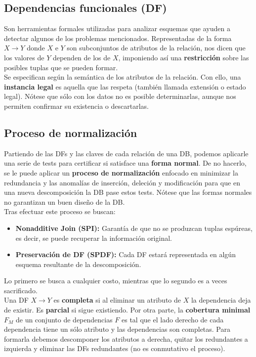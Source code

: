 \subsection*{Dependencias funcionales (DF)}
Son herramientas formales utilizadas para analizar esquemas que ayuden a detectar algunos de los problemas mencionados. Representadas de la forma $X \rightarrow Y$ donde $X$ e $Y$ son subconjuntos de atributos de la relación, nos dicen que los valores de $Y$ dependen de los de $X$, imponiendo así una \textbf{restricción} sobre las posibles tuplas que se pueden formar. \\
Se especifican según la semántica de los atributos de la relación. Con ello, una \textbf{instancia legal} es aquella que las respeta (también llamada extensión o estado legal). Nótese que sólo con los datos no es posible determinarlas, aunque nos permiten confirmar su existencia o descartarlas.

\subsection*{Proceso de normalización}
Partiendo de las DFs y las claves de cada relación de una DB, podemos aplicarle una serie de tests para certificar si satisface una \textbf{forma normal}. De no hacerlo, se le puede aplicar un \textbf{proceso de normalización} enfocado en minimizar la redundancia y las anomalías de inserción, deleción y modificación para que en una nueva descomposición la DB pase estos tests. Nótese que las formas normales no garantizan un buen diseño de la DB. \\
Tras efectuar este proceso se buscan:
\begin{itemize}
    \item \textbf{Nonadditive Join (SPI):} Garantía de que no se produzcan tuplas espúreas, es decir, se puede recuperar la información original.
    \item \textbf{Preservación de DF (SPDF):} Cada DF estará representada en algún esquema resultante de la descomposición.
\end{itemize}
Lo primero se busca a cualquier costo, mientras que lo segundo es a veces sacrificado. \\
Una DF $X \rightarrow Y$ es \textbf{completa} si al eliminar un atributo de $X$ la dependencia deja de existir. Es \textbf{parcial} si sigue existiendo. Por otra parte, la \textbf{cobertura minimal} $F_M$ de un conjunto de dependencias $F$ es tal que el lado derecho de cada dependencia tiene un sólo atributo y las dependencias son completas. Para formarla debemos descomponer los atributos a derecha, quitar los redundantes a izquierda y eliminar las DFs redundantes (no es conmutativo el proceso).


